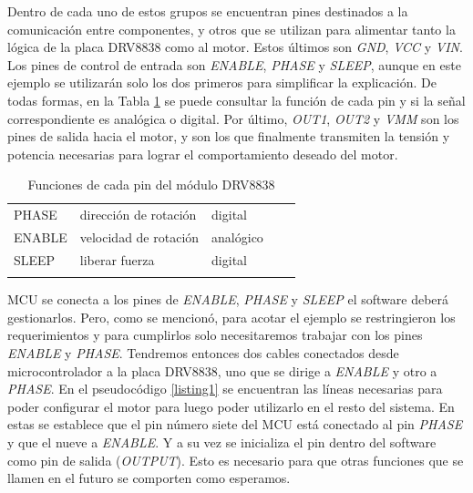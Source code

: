 Dentro de cada uno de estos grupos se encuentran pines destinados a la comunicación entre componentes, y otros que se utilizan para alimentar tanto la lógica de la placa \gls{DRV8838} como al motor. Estos últimos son \textit{GND}, \textit{VCC} y \textit{VIN}. Los pines de control de entrada son \textit{ENABLE}, \textit{PHASE} y \textit{SLEEP}, aunque en este ejemplo se utilizarán solo los dos primeros para simplificar la explicación. De todas formas, en la Tabla \ref{funciones_pin_drv8838} se puede consultar la función de cada pin y si la señal correspondiente es analógica o digital. Por último, \textit{OUT1}, \textit{OUT2} y \textit{VMM} son los pines de salida hacia el motor, y son los que finalmente transmiten la tensión y potencia necesarias para lograr el comportamiento deseado del motor.

\begin{table}[h]
\centering
\begin{tabular}{lllll}
\cline{1-3}
\multicolumn{1}{|l|}{PHASE}  & \multicolumn{1}{l|}{dirección de rotación} & \multicolumn{1}{l|}{digital}   &  &  \\ \cline{1-3}
\multicolumn{1}{|l|}{ENABLE} & \multicolumn{1}{l|}{velocidad de rotación} & \multicolumn{1}{l|}{analógico} &  &  \\ \cline{1-3}
\multicolumn{1}{|l|}{SLEEP}  & \multicolumn{1}{l|}{liberar fuerza}        & \multicolumn{1}{l|}{digital}   &  &  \\ \cline{1-3}
                             &                                            &                                &  & 
\end{tabular}
\caption{Funciones de cada pin del módulo DRV8838}
\label{funciones_pin_drv8838}
\end{table}

\gls{MCU} se conecta a los pines de \textit{ENABLE}, \textit{PHASE} y \textit{SLEEP} el software deberá gestionarlos. Pero, como se mencionó, para acotar el ejemplo se restringieron los requerimientos y para cumplirlos solo necesitaremos trabajar con los pines \textit{ENABLE} y \textit{PHASE}. Tendremos entonces dos cables conectados desde \gls{microcontrolador} a la placa \gls{DRV8838}, uno que se dirige a \textit{ENABLE} y otro a \textit{PHASE}. En el pseudocódigo \ref{listing1} se encuentran las líneas necesarias para poder configurar el motor para luego poder utilizarlo en el resto del sistema. En estas se establece que el pin número siete del \gls{MCU} está conectado al pin \textit{PHASE} y que el nueve a \textit{ENABLE}. Y a su vez se inicializa el pin dentro del software como pin de salida (\textit{OUTPUT}). Esto es necesario para que otras funciones que se llamen en el futuro se comporten como esperamos.

